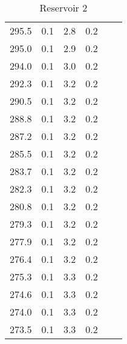 \begin{table}[!htp]
\begin{subtable}{0.48\textwidth}
\begin{tabular}{S[table-format=3.1] c S[table-format=1.1] S[table-format=1.1] c S[table-format=1.1]}
            295.5 & 0.1 & 2.8 & 0.2 \\
            295.0 & 0.1 & 2.9 & 0.2 \\
            294.0 & 0.1 & 3.0 & 0.2 \\
            292.3 & 0.1 & 3.2 & 0.2 \\
            290.5 & 0.1 & 3.2 & 0.2 \\
            288.8 & 0.1 & 3.2 & 0.2 \\
            287.2 & 0.1 & 3.2 & 0.2 \\
            285.5 & 0.1 & 3.2 & 0.2 \\
            283.7 & 0.1 & 3.2 & 0.2 \\
            282.3 & 0.1 & 3.2 & 0.2 \\
            280.8 & 0.1 & 3.2 & 0.2 \\
            279.3 & 0.1 & 3.2 & 0.2 \\
            277.9 & 0.1 & 3.2 & 0.2 \\
            276.4 & 0.1 & 3.2 & 0.2 \\
            275.3 & 0.1 & 3.3 & 0.2 \\
            274.6 & 0.1 & 3.3 & 0.2 \\
            274.0 & 0.1 & 3.3 & 0.2 \\
            273.5 & 0.1 & 3.3 & 0.2 \\
            \bottomrule
        \end{tabular}
        \caption{Reservoir 2}
    \end{subtable}
\end{table}